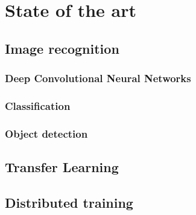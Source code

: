
\chapter{State of the art}

\ifpdf
    \graphicspath{{Chapter2/Figs/Raster/}{Chapter2/Figs/PDF/}{Chapter2/Figs/}}
\else
    \graphicspath{{Chapter2/Figs/Vector/}{Chapter2/Figs/}}
\fi


\section[Short title]{Image recognition}

\subsection{Deep Convolutional Neural Networks}

\subsection{Classification}

\subsection{Object detection}

\section{Transfer Learning}

\section{Distributed training}




